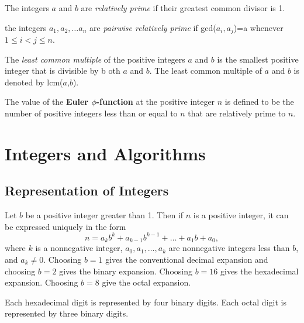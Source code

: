 \begin{definition}
The integers $a$ and $b$ are \textit{relatively prime} if their greatest common divisor is 1.
\end{definition}

\begin{definition}
the integers $a_1,a_2, \dots a_n$ are \textit{pairwise relatively prime} if gcd($a_i,a_j$)=a whenever $1\le i < j \le n$.
\end{definition}

\begin{definition}
The \textit{least common multiple} of the positive integers $a$ and $b$ is the smallest positive integer that is divisible by b oth $a$ and $b$. The least common multiple of $a$ and $b$ is denoted by lcm($a$,$b$).
\end{definition}

\begin{definition} 
The value of the \textbf{Euler $\phi$-function} at the positive integer $n$ is defined to be the number of positive integers less than or equal to $n$ that are relatively prime to $n$. 
\end{definition}

\section {Integers and Algorithms}
  \subsection {Representation of Integers}
\begin{theorem}
Let $b$ be a positive integer greater than 1. Then if $n$ is a positive integer, it can be expressed uniquely in the form
$$n=a_kb^k+a_{k-1}b^{k-1}+ \dots +a_1b + a_0,$$
where $k$ is a nonnegative integer, $a_0,a_1, \dots,a_k$ are nonnegative integers less than $b$, and $a_k\neq0$. Choosing $b=1$ gives the conventional decimal expansion and choosing $b=2$ gives the binary expansion. Choosing $b=16$ gives the hexadecimal expansion. Choosing $b=8$ give the octal expansion.
\end{theorem}

\begin{notes}
Each hexadecimal digit is represented by four binary digits. Each octal digit is represented by three binary digits.
\end{notes}

